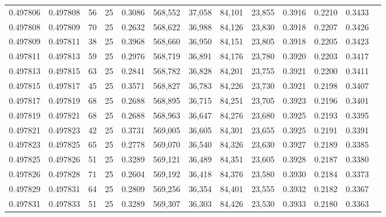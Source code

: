 \begin{tabular}{rrrrrrrrrrrrr}
0.497806 & 0.497808 &    56 &  25 &                                     0.3086 & 568,552 &  37,058 &  84,101 &  23,855 & 0.3916 & 0.2210 & 0.3433 \\
0.497808 & 0.497809 &    70 &  25 &                                     0.2632 & 568,622 &  36,988 &  84,126 &  23,830 & 0.3918 & 0.2207 & 0.3426 \\
0.497809 & 0.497811 &    38 &  25 &                                     0.3968 & 568,660 &  36,950 &  84,151 &  23,805 & 0.3918 & 0.2205 & 0.3423 \\
0.497811 & 0.497813 &    59 &  25 &                                     0.2976 & 568,719 &  36,891 &  84,176 &  23,780 & 0.3920 & 0.2203 & 0.3417 \\
0.497813 & 0.497815 &    63 &  25 &                                     0.2841 & 568,782 &  36,828 &  84,201 &  23,755 & 0.3921 & 0.2200 & 0.3411 \\
0.497815 & 0.497817 &    45 &  25 &                                     0.3571 & 568,827 &  36,783 &  84,226 &  23,730 & 0.3921 & 0.2198 & 0.3407 \\
0.497817 & 0.497819 &    68 &  25 &                                     0.2688 & 568,895 &  36,715 &  84,251 &  23,705 & 0.3923 & 0.2196 & 0.3401 \\
0.497819 & 0.497821 &    68 &  25 &                                     0.2688 & 568,963 &  36,647 &  84,276 &  23,680 & 0.3925 & 0.2193 & 0.3395 \\
0.497821 & 0.497823 &    42 &  25 &                                     0.3731 & 569,005 &  36,605 &  84,301 &  23,655 & 0.3925 & 0.2191 & 0.3391 \\
0.497823 & 0.497825 &    65 &  25 &                                     0.2778 & 569,070 &  36,540 &  84,326 &  23,630 & 0.3927 & 0.2189 & 0.3385 \\
0.497825 & 0.497826 &    51 &  25 &                                     0.3289 & 569,121 &  36,489 &  84,351 &  23,605 & 0.3928 & 0.2187 & 0.3380 \\
0.497826 & 0.497828 &    71 &  25 &                                     0.2604 & 569,192 &  36,418 &  84,376 &  23,580 & 0.3930 & 0.2184 & 0.3373 \\
0.497829 & 0.497831 &    64 &  25 &                                     0.2809 & 569,256 &  36,354 &  84,401 &  23,555 & 0.3932 & 0.2182 & 0.3367 \\
0.497831 & 0.497833 &    51 &  25 &                                     0.3289 & 569,307 &  36,303 &  84,426 &  23,530 & 0.3933 & 0.2180 & 0.3363 \\

\end{tabular}
